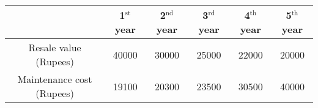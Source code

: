 \begin{center}
\begin{tabular}{|c|c|c|c|c|c|}
\hline
 & 1$^{\text{st}}$ year & 2$^{\text{nd}}$ year & 3$^{\text{rd}}$ year & 4$^{\text{th}}$ year & 5$^{\text{th}}$ year \\
\hline
Resale value (Rupees) & 40000 & 30000 & 25000 & 22000 & 20000 \\
\hline
Maintenance cost (Rupees) & 19100 & 20300 & 23500 & 30500 & 40000 \\
\hline
\end{tabular}
\end{center}